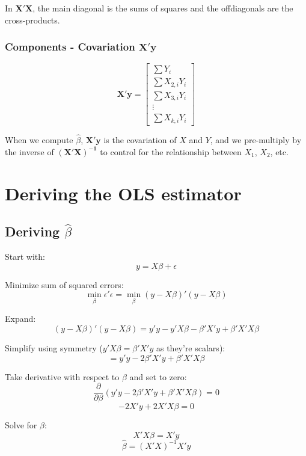 \documentclass[
  letterpaper,
  DIV=11,
  numbers=noendperiod]{scrartcl}
\begin{document}
\noindent In \(\mathbf{X'X}\), the main diagonal is the sums of squares
and the offdiagonals are the cross-products.

\subsubsection{\texorpdfstring{Components - Covariation
\(\mathbf{X'y}\)}{Components - Covariation \textbackslash mathbf\{X\textquotesingle y\}}}\label{components---covariation-mathbfxy}

\[
\mathbf{X'y}= \left[
\begin{matrix}
\sum Y_{i}\\
\sum X_{2,i}Y_{i}\\
\sum X_{3,i}Y_{i}\\
\vdots \\
\sum X_{k,i}Y_{i} \nonumber
\end{matrix}  \right] 
\]

When we compute \(\widehat{\beta}\), \(\mathbf{X'y}\) is the covariation
of \(X\) and \(Y\), and we pre-multiply by the inverse of
\(\mathbf{(X'X)^{-1}}\) to control for the relationship between
\(X_{1}\), \(X_{2}\), etc.

\section{Deriving the OLS estimator}\label{deriving-the-ols-estimator}

\subsection{\texorpdfstring{Deriving
\(\hat{\beta}\)}{Deriving \textbackslash hat\{\textbackslash beta\}}}\label{deriving-hatbeta}

Start with: \[y = X\beta + \epsilon\]

Minimize sum of squared errors:
\[\min_{\beta} \epsilon'\epsilon = \min_{\beta} (y - X\beta)'(y - X\beta)\]

Expand:
\[(y - X\beta)'(y - X\beta) = y'y - y'X\beta - \beta'X'y + \beta'X'X\beta\]

Simplify using symmetry (\(y'X\beta = \beta'X'y\) as they're scalars):
\[= y'y - 2\beta'X'y + \beta'X'X\beta\]

Take derivative with respect to \(\beta\) and set to zero:
\[\frac{\partial}{\partial\beta}(y'y - 2\beta'X'y + \beta'X'X\beta) = 0\]
\[-2X'y + 2X'X\beta = 0\]

Solve for \(\beta\): \[X'X\beta = X'y\] \[\hat{\beta} = (X'X)^{-1}X'y\]
\end{document}
